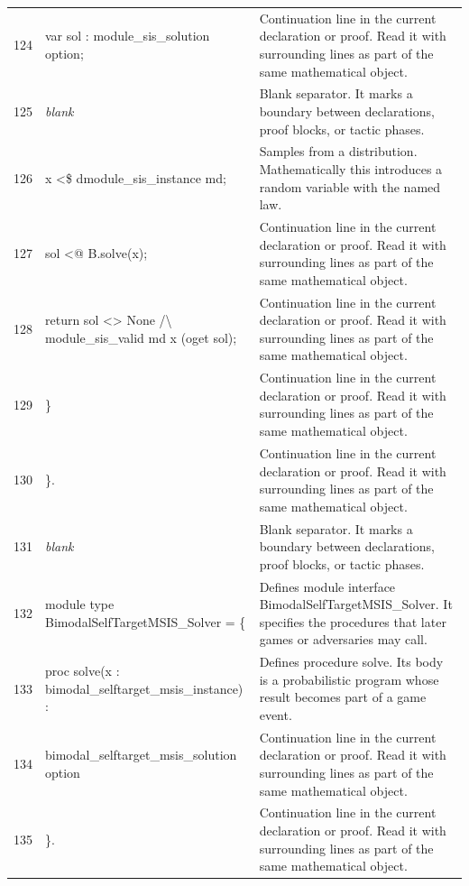 \documentclass[10pt]{article}
\begin{document}
\begin{longtable}{r L{0.53\textwidth} L{0.37\textwidth}}
124 & {\ttfamily\scriptsize     var sol : module\_sis\_solution option;} & Continuation line in the current declaration or proof.  Read it with surrounding lines as part of the same mathematical object. \\
125 & {\ttfamily\scriptsize \emph{blank}} & Blank separator.  It marks a boundary between declarations, proof blocks, or tactic phases. \\
126 & {\ttfamily\scriptsize     x <\$ dmodule\_sis\_instance md;} & Samples from a distribution.  Mathematically this introduces a random variable with the named law. \\
127 & {\ttfamily\scriptsize     sol <@ B.solve(x);} & Continuation line in the current declaration or proof.  Read it with surrounding lines as part of the same mathematical object. \\
128 & {\ttfamily\scriptsize     return sol <> None /\textbackslash{} module\_sis\_valid md x (oget sol);} & Continuation line in the current declaration or proof.  Read it with surrounding lines as part of the same mathematical object. \\
129 & {\ttfamily\scriptsize   \}} & Continuation line in the current declaration or proof.  Read it with surrounding lines as part of the same mathematical object. \\
130 & {\ttfamily\scriptsize \}.} & Continuation line in the current declaration or proof.  Read it with surrounding lines as part of the same mathematical object. \\
131 & {\ttfamily\scriptsize \emph{blank}} & Blank separator.  It marks a boundary between declarations, proof blocks, or tactic phases. \\
132 & {\ttfamily\scriptsize module type BimodalSelfTargetMSIS\_Solver = \{} & Defines module interface BimodalSelfTargetMSIS\_Solver.  It specifies the procedures that later games or adversaries may call. \\
133 & {\ttfamily\scriptsize   proc solve(x : bimodal\_selftarget\_msis\_instance) :} & Defines procedure solve.  Its body is a probabilistic program whose result becomes part of a game event. \\
134 & {\ttfamily\scriptsize     bimodal\_selftarget\_msis\_solution option} & Continuation line in the current declaration or proof.  Read it with surrounding lines as part of the same mathematical object. \\
135 & {\ttfamily\scriptsize \}.} & Continuation line in the current declaration or proof.  Read it with surrounding lines as part of the same mathematical object. \\

\end{longtable}
\end{document}
